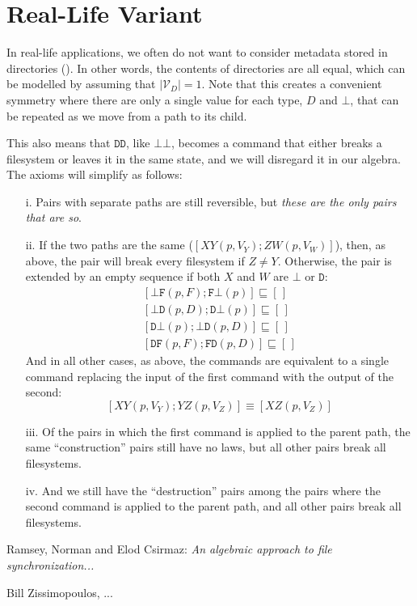 \documentclass[12pt]{article}
\newcommand{\setvx}[1]{\mathcal{V}_{#1}}
\newcommand{\setd}{\setvx{D}}
\newcommand{\empt}{\bot}
\newcommand{\fscommand}[2]{{#1#2}}
\newcommand{\fsregcommandchar}[1]{\mathtt{#1}}
\newcommand{\fsregcommand}[2]{\fscommand{\fsregcommandchar{#1}}{\fsregcommandchar{#2}}}
\newcommand{\cbb}{\fsregcommand{\empt}{\empt}}
\newcommand{\cbf}{\fsregcommand{\empt}{F}}
\newcommand{\cbd}{\fsregcommand{\empt}{D}}
\newcommand{\cfb}{\fsregcommand{F}{\empt}}
\newcommand{\cfd}{\fsregcommand{F}{D}}
\newcommand{\cdb}{\fsregcommand{D}{\empt}}
\newcommand{\cdf}{\fsregcommand{D}{F}}
\newcommand{\cdd}{\fsregcommand{D}{D}}
\newcommand{\cxy}{\fscommand{X}{Y}}
\newcommand{\cyz}{\fscommand{Y}{Z}}
\newcommand{\cxz}{\fscommand{X}{Z}}
\newcommand{\czw}{\fscommand{Z}{W}}
\newcommand{\eqext}{\sqsubseteq}
\newcommand{\emptyseq}{[\,]}
\begin{document}
\section{Real-Life Variant}

In real-life applications, we often do not want to consider metadata stored in
directories (\cite{BZ}). In other words, the contents of directories are all equal,
which can be modelled by assuming that $|\setd|=1$.
Note that this creates a convenient symmetry where there are only a single value
for each type, $D$ and $\empt$, that can be repeated as we move from a path to its child.

This also means that $\cdd$, like $\cbb$, becomes a command that either breaks a filesystem
or leaves it in the same state, and we will disregard it in our algebra.
The axioms will simplify as follows:

\begin{itemize}
\item[i.] Pairs with separate paths are still reversible,
but \emph{these are the only pairs that are so}.
%
\item[ii.] If the two paths are the same ($[\cxy(p,V_Y); \czw(p,V_W)]$), then, as above,
the pair will break every filesystem if $Z\ne Y$.
Otherwise, the pair is extended by an empty sequence
if both $X$ and $W$ are $\fsregcommandchar{\empt}$ or $\fsregcommandchar{D}$:
\begin{gather*}
           [\cbf(p, F); \cfb(p)] \eqext \emptyseq \\
           [\cbd(p, D); \cdb(p)] \eqext \emptyseq \\
           [\cdb(p); \cbd(p, D)] \eqext \emptyseq \\
           [\cdf(p, F); \cfd(p, D)] \eqext \emptyseq
\end{gather*}
And in all other cases, as above, the commands are equivalent to a single command
replacing the input of the first command with the output of the second:
\[ [\cxy(p, V_Y); \cyz(p, V_Z)] \equiv [\cxz(p, V_Z)] \]
%
\item[iii.]
Of the pairs in which the first command is applied to the parent path,
the same ``construction'' pairs still have no laws, but all other pairs
break all filesystems.
%
\item[iv.]
And we still have the ``destruction'' pairs among the pairs where the second command
is applied to the parent path, and all other pairs break all filesystems.
\end{itemize}


\begin{thebibliography}{99}

 Ramsey, Norman and Elod Csirmaz: {\it An algebraic approach to
file synchronization...}

 Bill Zissimopoulos, ...

\end{thebibliography}
\end{document}

